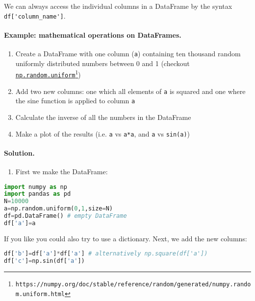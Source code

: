 \documentclass[graybox,sectrefs,envcountresetchap,open=right,final]{svmonodo}
\begin{document}
We can always access the individual columns in a DataFrame by the syntax \Verb!df['column_name']!. 
\paragraph{Example: mathematical operations on DataFrames.}
\begin{enumerate}
\item Create a DataFrame with one column (\texttt{a}) containing ten thousand random uniformly distributed numbers between 0 and 1 (checkout \href{{https://numpy.org/doc/stable/reference/random/generated/numpy.random.uniform.html}}{\nolinkurl{np.random.uniform}\footnote{\texttt{https://numpy.org/doc/stable/reference/random/generated/numpy.random.uniform.html}}})

\item Add two new columns: one which all elements of \texttt{a} is squared and one where the sine function is applied to column \texttt{a}

\item Calculate the inverse of all the numbers in the DataFrame

\item Make a plot of the results (i.e. \texttt{a} vs \texttt{a*a}, and \texttt{a} vs \texttt{sin(a)})
\end{enumerate}

\noindent
\paragraph{Solution.}
\begin{enumerate}
\item First we make the DataFrame:
\end{enumerate}

\noindent







\begin{lstlisting}[language=python,style=blue1bar]
import numpy as np
import pandas as pd
N=10000
a=np.random.uniform(0,1,size=N)
df=pd.DataFrame() # empty DataFrame
df['a']=a

\end{lstlisting}

If you like you could also try to use a dictionary. Next, we add the new columns:



\begin{lstlisting}[language=python,style=blue1bar]
df['b']=df['a']*df['a'] # alternatively np.square(df['a'])
df['c']=np.sin(df['a'])

\end{lstlisting}
\end{document}
